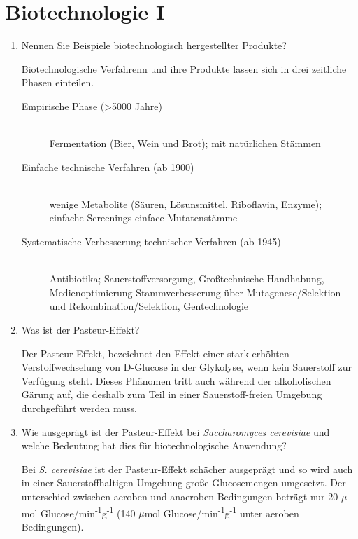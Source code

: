 
\section{Biotechnologie I}
\begin{enumerate}
	\item Nennen Sie Beispiele biotechnologisch hergestellter Produkte?
		
		 Biotechnologische Verfahrenn und ihre Produkte lassen sich in drei
		 zeitliche Phasen einteilen.
		 \begin{description}
		 	\item[Empirische Phase (>5000 Jahre)] \hfill \\
				Fermentation (Bier, Wein und Brot); mit natürlichen Stämmen
			\item[Einfache technische Verfahren (ab 1900)] \hfill \\
				wenige Metabolite (Säuren, Lösunsmittel, Riboflavin, Enzyme);
				einfache Screenings \textrightarrow einface Mutatenstämme
			\item[Systematische Verbesserung technischer Verfahren (ab 1945)] \hfill \\
				Antibiotika; Sauerstoffversorgung, Großtechnische Handhabung, Medienoptimierung
				Stammverbesserung über Mutagenese/Selektion und Rekombination/Selektion, Gentechnologie 
		\end{description}

	\item Was ist der Pasteur-Effekt?
			
		Der Pasteur-Effekt,
		bezeichnet den Effekt einer stark erhöhten Verstoffwechselung von D-Glucose in der Glykolyse,
		wenn kein Sauerstoff zur Verfügung steht.
		Dieses Phänomen tritt auch während der alkoholischen Gärung auf,
		die deshalb zum Teil in einer Sauerstoff-freien Umgebung durchgeführt werden muss.
			
	\item Wie ausgeprägt ist der Pasteur-Effekt bei \emph{Saccharomyces cerevisiae} und welche Bedeutung hat dies für biotechnologische Anwendung?
		
		Bei \emph{S. cerevisiae} ist der Pasteur-Effekt schächer ausgeprägt
		und so wird auch in einer Sauerstoffhaltigen Umgebung große Glucosemengen umgesetzt.
		Der unterschied zwischen aeroben und
		anaeroben Bedingungen beträgt nur 20 \begin{math}\mu\end{math}mol Glucose/min\textsuperscript{-1}g\textsuperscript{-1}
		(140 \begin{math}\mu\end{math}mol Glucose/min\textsuperscript{-1}g\textsuperscript{-1} unter aeroben Bedingungen).


\end{enumerate}

